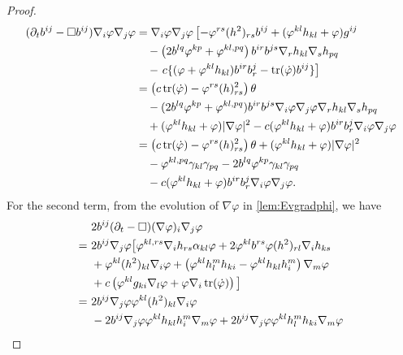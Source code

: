 \documentclass{amsart}
\begin{document}
\begin{proof}
\begin{equation}
\begin{split}
(\partial_{t}b^{ij} - \Box b^{ij})\nabla_i \varphi\nabla_j\varphi &= \nabla_i \varphi \nabla_j \varphi\left[-\varphi^{rs} (h^2)_{rs} b^{ij} + (\varphi^{kl}h_{kl} + \varphi) g^{ij} \right. \\
& \quad - \left(2b^{lq}\varphi^{kp} + \varphi^{kl,pq}\right) b^{ir}b^{js} \nabla_r h_{kl} \nabla_s h_{pq} \\
& \quad - \left. c \{(\varphi + \varphi^{kl}h_{kl}) b^{ir}b^{j}_{r} - \operatorname{tr}(\dot{\varphi}) b^{ij}\}\right] \\
&= \left(c\operatorname{tr}(\dot{\varphi}) - \varphi^{rs}(h)^2_{rs}\right) \theta\\ & \quad - (2b^{lq}\varphi^{kp} + \varphi^{kl,pq}) b^{ir}b^{js}\nabla_i\varphi\nabla_j\varphi\nabla_rh_{kl}\nabla_s h_{pq} \\
&\quad + (\varphi^{kl}h_{kl} + \varphi)|\nabla\varphi|^{2} - c(\varphi^{kl}h_{kl} + \varphi)b^{ir}b^{j}_{r}\nabla_i \varphi\nabla_j\varphi \\
&= \left(c\operatorname{tr}(\dot{\varphi}) - \varphi^{rs}(h)^2_{rs}\right) \theta  + (\varphi^{kl}h_{kl} + \varphi)|\nabla\varphi|^{2} \\
&\quad - \varphi^{kl,pq} \gamma_{kl} \gamma_{pq} - 2b^{lq}\varphi^{kp} \gamma_{kl} \gamma_{pq}  \\ 
&\quad -c(\varphi^{kl}h_{kl} + \varphi)b^{ir}b^{j}_{r}\nabla_i \varphi\nabla_j\varphi.
\end{split}
\end{equation}
For the second term, from the evolution of \(\nabla\varphi\) in \cref{lem:Evgradphi}, we have
\begin{equation}
\label{eq:delt_theta2}
\begin{split}
&2 b^{ij} (\partial_{t} - \Box) (\nabla\varphi)_i \nabla_j\varphi\\  
=\ &2 b^{ij} \nabla_j\varphi \big[\varphi^{kl,rs}\nabla_i h_{rs} \a_{kl}\varphi + 2 \varphi^{kl} b^{rs} \varphi(h^2)_{rl} \nabla_i h_{ks}  \\
\quad &+ \varphi^{kl}(h^2)_{kl}\nabla_i \varphi + \left(\varphi^{kl}h^{m}_{l}h_{ki} - \varphi^{kl}h_{kl}h^{m}_{i}\right) \nabla_m \varphi\\
\quad &+ c\left(\varphi^{kl}g_{ki} \nabla_l \varphi + \varphi \nabla_i \operatorname{tr}(\dot{\p})\right)\big] \\
=\ &2 b^{ij} \nabla_j\varphi \varphi^{kl}(h^2)_{kl}\nabla_i \varphi \\
\quad &- 2 b^{ij} \nabla_j\varphi \varphi^{kl}h_{kl}h^{m}_{i} \nabla_m \varphi + 2 b^{ij} \nabla_j\varphi \varphi^{kl}h^{m}_{l}h_{ki} \nabla_m \varphi \\

\end{split}
\end{equation}
\end{proof}
\end{document}
